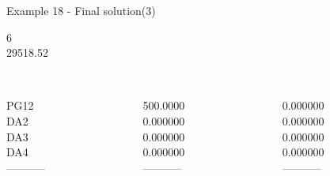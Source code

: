 \begin{frame}{Example 18 - Final solution(3)}

 6 \\
  29518.52\\

\begin{columns}[t]
\begin{column}{0.3\textwidth}
\\

PG12\\
DA2\\
DA3\\
DA4\\
-----------\\
\end{column}
\begin{column}{0.3\textwidth}
\\
500.0000\\
0.000000\\
0.000000\\
0.000000\\
-----------\\
\end{column}  

\begin{column}{0.3\textwidth}
\\
0.000000\\
0.000000\\
0.000000\\
0.000000\\
-----------\\
\end{column}
\end{columns}
\end{frame}
